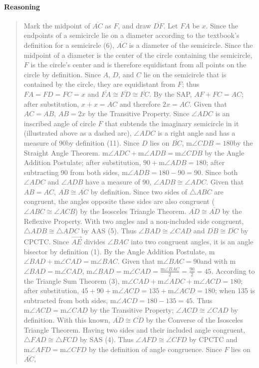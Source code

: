 \documentclass[letterpaper,12pt,twoside]{report}
\begin{document}
	\paragraph{Reasoning}
	\begin{quotation}
		
		Mark the midpoint of $\overline{AC}$ as $F$, and draw $\overline{DF}$. Let $FA$ be $x$. Since the endpoints of a semicircle lie on a diameter according to the textbook's definition for a semicircle (6), $\overline{AC}$ is a diameter of the semicircle. Since the midpoint of a diameter is the center of the circle containing the semicircle, $F$ is the circle's center and is therefore equidistant from all points on the circle by definition. Since $A$, $D$, and $C$ lie on the semicircle that is contained by the circle, they are equidistant from $F$; thus $FA=FD=FC=x$ and $\overline{FA}\cong\overline{FD}\cong\overline{FC}$. By the SAP, $AF+FC=AC$; after substitution, $x+x=AC$ and therefore $2x=AC$. Given that $AC=AB$, $AB=2x$ by the Transitive Property. Since $\angle ADC$ is an inscribed angle of circle $F$ that subtends the imaginary semicircle in it (illustrated above as a dashed arc), $\angle ADC$ is a right angle and has a measure of 90\textdegree \space by definition (11). Since $D$ lies on $\overline{BC}$, $\text{m}\angle CDB=180$\textdegree \space by the Straight Angle Theorem. $\text{m}\angle ADC+\text{m}\angle ADB=\text{m}\angle CDB$ by the Angle Addition Postulate; after substitution, $90+\text{m}\angle ADB=180$; after subtracting 90 from both sides, $\text{m}\angle ADB=180-90=90$\textdegree. Since both $\angle ADC$ and $\angle ADB$ have a measure of 90\textdegree, $\angle ADB\cong\angle ADC$. Given that $AB=AC$, $\overline{AB}\cong\overline{AC}$ by definition. Since two sides of $\triangle ABC$ are congruent, the angles opposite these sides are also congruent ($\angle ABC\cong\angle ACB$) by the Isosceles Triangle Theorem. $\overline{AD}\cong\overline{AD}$ by the Reflexive Property. With two angles and a non-included side congruent, $\triangle ADB\cong\triangle ADC$ by AAS (5). Thus $\angle BAD\cong\angle CAD$ and $\overline{DB}\cong\overline{DC}$ by CPCTC. Since $\overrightarrow{AE}$ divides $\angle BAC$ into two congruent angles, it is an angle bisector by definition (1). By the Angle Addition Postulate, m$\angle BAD+\text{m}\angle CAD=\text{m}\angle BAC$. Given that m$\angle BAC=90$\textdegree \space and with m$\angle BAD=\text{m}\angle CAD$, $\text{m}\angle BAD=\text{m}\angle CAD=\frac{\text{m}\angle BAC}{2}=\frac{90}{2}=45$\textdegree. According to the Triangle Sum Theorem (3), $\text{m}\angle CAD+\text{m}\angle ADC+\text{m}\angle ACD=180$\textdegree; after substitution, $45+90+\text{m}\angle ACD=135+\text{m}\angle ACD=180$; when 135 is subtracted from both sides, $\text{m}\angle ACD=180-135=45$\textdegree. Thus $\text{m}\angle ACD=\text{m}\angle CAD$ by the Transitive Property; $\angle ACD\cong\angle CAD$ by definition. With this known, $\overline{AD}\cong\overline{CD}$ by the Converse of the Isosceles Triangle Theorem. Having two sides and their included angle congruent, $\triangle FAD\cong\triangle FCD$ by SAS (4). Thus $\angle AFD\cong\angle CFD$ by CPCTC and $\text{m}\angle AFD=\text{m}\angle CFD$ by the definition of angle congruence. Since $F$ lies on $\overline{AC}$, 
\end{quotation}
\end{document}
